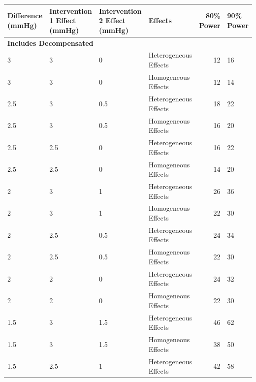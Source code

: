\documentclass[
]{article}
\begin{document}
\begin{table}[H]
\centering
\begin{tabular}{l|l|l|l|r|l}
\hline
Difference (mmHg) & Intervention 1 Effect (mmHg) & Intervention 2 Effect (mmHg) & Effects & 80\% Power & 90\% Power\\
\hline
\multicolumn{6}{l}{\textbf{Includes Decompensated}}\\
\hline
\hspace{1em}3 & 3 & 0 & Heterogeneous Effects & 12 & 16\\
\hline
\hspace{1em}3 & 3 & 0 & Homogeneous Effects & 12 & 14\\
\hline
\hspace{1em}2.5 & 3 & 0.5 & Heterogeneous Effects & 18 & 22\\
\hline
\hspace{1em}2.5 & 3 & 0.5 & Homogeneous Effects & 16 & 20\\
\hline
\hspace{1em}2.5 & 2.5 & 0 & Heterogeneous Effects & 16 & 22\\
\hline
\hspace{1em}2.5 & 2.5 & 0 & Homogeneous Effects & 14 & 20\\
\hline
\hspace{1em}2 & 3 & 1 & Heterogeneous Effects & 26 & 36\\
\hline
\hspace{1em}2 & 3 & 1 & Homogeneous Effects & 22 & 30\\
\hline
\hspace{1em}2 & 2.5 & 0.5 & Heterogeneous Effects & 24 & 34\\
\hline
\hspace{1em}2 & 2.5 & 0.5 & Homogeneous Effects & 22 & 30\\
\hline
\hspace{1em}2 & 2 & 0 & Heterogeneous Effects & 24 & 32\\
\hline
\hspace{1em}2 & 2 & 0 & Homogeneous Effects & 22 & 30\\
\hline
\hspace{1em}1.5 & 3 & 1.5 & Heterogeneous Effects & 46 & 62\\
\hline
\hspace{1em}1.5 & 3 & 1.5 & Homogeneous Effects & 38 & 50\\
\hline
\hspace{1em}1.5 & 2.5 & 1 & Heterogeneous Effects & 42 & 58\\

\end{tabular}
\end{table}
\end{document}
